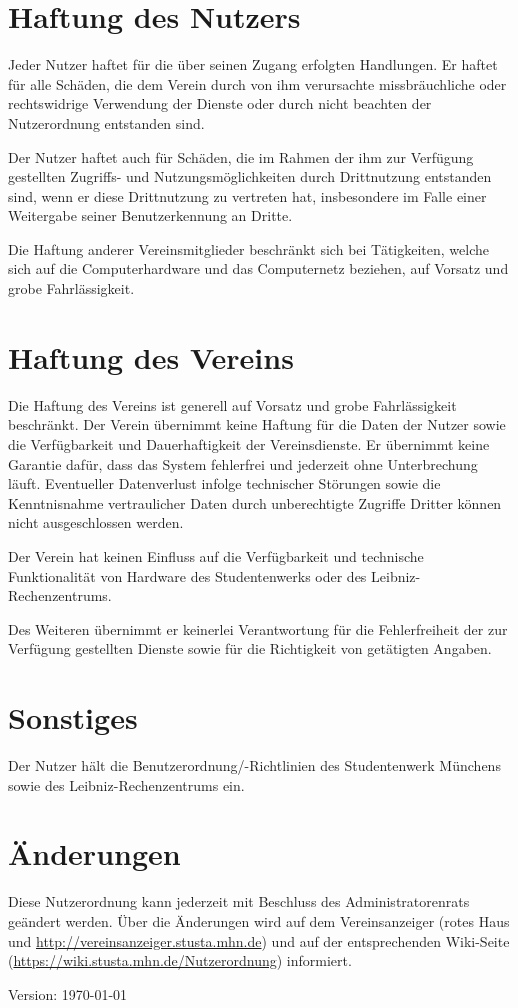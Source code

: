 \documentclass[a4paper,10pt]{scrartcl}
\begin{document}
\section{Haftung des Nutzers}
Jeder Nutzer haftet für die über seinen Zugang erfolgten Handlungen. Er haftet für alle Schäden, die dem Verein durch von ihm verursachte missbräuchliche oder rechtswidrige Verwendung der Dienste oder durch nicht beachten der Nutzerordnung entstanden sind.

Der Nutzer haftet auch für Schäden, die im Rahmen der ihm zur Verfügung gestellten Zugriffs- und Nutzungsmöglichkeiten durch Drittnutzung entstanden sind, wenn er diese Drittnutzung zu vertreten hat, insbesondere im Falle einer Weitergabe seiner Benutzerkennung an Dritte.

Die Haftung anderer Vereinsmitglieder beschränkt sich bei Tätigkeiten, welche sich auf die Computerhardware und das Computernetz beziehen, auf Vorsatz und grobe Fahrlässigkeit.

\section{Haftung des Vereins}
Die Haftung des Vereins ist generell auf Vorsatz und grobe Fahrlässigkeit beschränkt. Der Verein übernimmt keine Haftung für die Daten der Nutzer sowie die Verfügbarkeit und Dauerhaftigkeit der Vereinsdienste. Er übernimmt keine Garantie dafür, dass das System fehlerfrei und jederzeit ohne Unterbrechung läuft. Eventueller Datenverlust infolge technischer Störungen sowie die Kenntnisnahme vertraulicher Daten durch unberechtigte Zugriffe Dritter können nicht ausgeschlossen werden.

Der Verein hat keinen Einfluss auf die Verfügbarkeit und technische Funktionalität von Hardware des Studentenwerks oder des Leibniz-Rechenzentrums.

Des Weiteren übernimmt er keinerlei Verantwortung für die Fehlerfreiheit der zur Verfügung gestellten Dienste sowie für die Richtigkeit von getätigten Angaben.

\section{Sonstiges}
Der Nutzer hält die Benutzerordnung/-Richtlinien des Studentenwerk Münchens sowie des Leibniz-Rechenzentrums ein.

\section{Änderungen}
Diese Nutzerordnung kann jederzeit mit Beschluss des Administratorenrats geändert werden. Über die Änderungen wird auf dem Vereinsanzeiger (rotes Haus und \url{http://vereinsanzeiger.stusta.mhn.de}) und auf der entsprechenden Wiki-Seite (\url{https://wiki.stusta.mhn.de/Nutzerordnung}) informiert. 


\enlargethispage{40pt}

\hfill Version: \today
\end{document}
